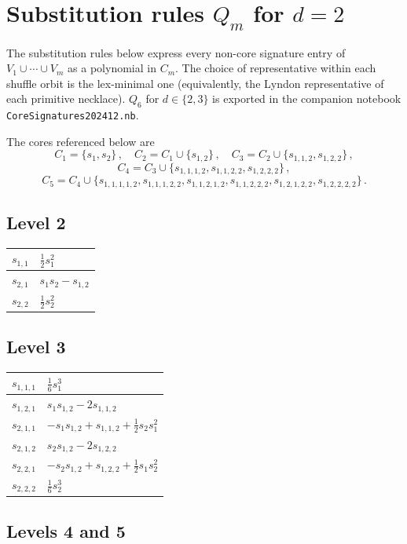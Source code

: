 \documentclass[12pt,english]{article}
\providecommand{\tabularnewline}{\\}
\newcommand{\nbfile}[1]{\nolinkurl{#1}}
\theoremstyle{remark}
\begin{document}
\section{Substitution rules $Q_{m}$ for $d=2$\label{app:Q5}}

The substitution rules below express every non-core signature entry
of $V_{1}\cup\cdots\cup V_{m}$ as a polynomial in $C_{m}$. The choice
of representative within each shuffle orbit is the lex-minimal one
(equivalently, the Lyndon representative of each primitive necklace).
$Q_{6}$ for $d\in\{2,3\}$ is exported in the companion notebook
\nbfile{CoreSignatures202412.nb}.

The cores referenced below are
\[
C_{1}=\{s_{1},s_{2}\}\,,\quad C_{2}=C_{1}\cup\{s_{1,2}\}\,,\quad C_{3}=C_{2}\cup\{s_{1,1,2},s_{1,2,2}\}\,,
\]
\[
C_{4}=C_{3}\cup\{s_{1,1,1,2},s_{1,1,2,2},s_{1,2,2,2}\}\,,
\]
\[
C_{5}=C_{4}\cup\{s_{1,1,1,1,2},s_{1,1,1,2,2},s_{1,1,2,1,2},s_{1,1,2,2,2},s_{1,2,1,2,2},s_{1,2,2,2,2}\}\,.
\]

\subsection{Level 2}
\begin{tabular}{|l|l|}
\hline
$s_{1,1}$ & $\frac{1}{2}s_{1}^{2}$\tabularnewline\hline
$s_{2,1}$ & $s_{1}s_{2}-s_{1,2}$\tabularnewline\hline
$s_{2,2}$ & $\frac{1}{2}s_{2}^{2}$\tabularnewline\hline
\end{tabular}

\subsection{Level 3}
\begin{tabular}{|l|l|}
\hline
$s_{1,1,1}$ & $\frac{1}{6}s_{1}^{3}$\tabularnewline\hline
$s_{1,2,1}$ & $s_{1}s_{1,2}-2s_{1,1,2}$\tabularnewline\hline
$s_{2,1,1}$ & $-s_{1}s_{1,2}+s_{1,1,2}+\frac{1}{2}s_{2}s_{1}^{2}$\tabularnewline\hline
$s_{2,1,2}$ & $s_{2}s_{1,2}-2s_{1,2,2}$\tabularnewline\hline
$s_{2,2,1}$ & $-s_{2}s_{1,2}+s_{1,2,2}+\frac{1}{2}s_{1}s_{2}^{2}$\tabularnewline\hline
$s_{2,2,2}$ & $\frac{1}{6}s_{2}^{3}$\tabularnewline\hline
\end{tabular}

\subsection{Levels 4 and 5}
\end{document}
